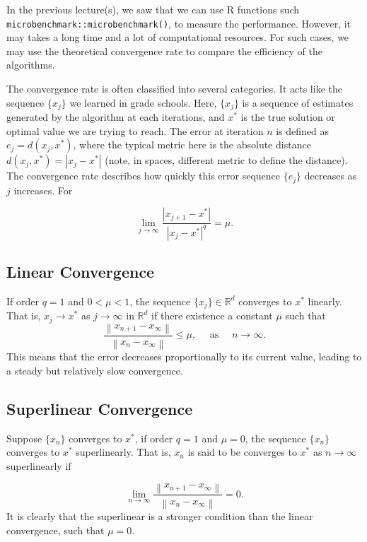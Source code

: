 \documentclass[
  letterpaper,
  DIV=11,
  numbers=noendperiod]{scrreprt}
\begin{document}
In the previous lecture(s), we saw that we can use R functions such
\texttt{microbenchmark::microbenchmark()}, to measure the performance.
However, it may takes a long time and a lot of computational resources.
For such cases, we may use the theoretical convergence rate to compare
the efficiency of the algorithms.

The convergence rate is often classified into several categories. It
acts like the sequence \(\{x_j\}\) we learned in grade schools. Here,
\(\{x_j\}\) is a sequence of estimates generated by the algorithm at
each iterations, and \(x^*\) is the true solution or optimal value we
are trying to reach. The error at iteration \(n\) is defined as
\(e_j = d(x_j,x^*)\), where the typical metric here is the absolute
distance \(d(x_j,x^*)=|x_j-x^*|\) (note, in spaces, different metric to
define the distance). The convergence rate describes how quickly this
error sequence \(\{e_j\}\) decreases as \(j\) increases. For

\[
\lim_{j \to \infty} \frac{\left|x_{j+1}-x^* \right|}{\left|x_j-x^* \right|^q }=\mu.
\]

\subsection{Linear Convergence}\label{linear-convergence}

If order \(q = 1\) and \(0 < \mu < 1\), the sequence
\(\{x_j\}\in\mathbb R^d\) converges to \(x^*\) linearly. That is,
\(x_j\to x^*\) as \(j\to\infty\) in \(\mathbb R^d\) if there existence a
constant \(\mu\) such that \[
  \frac{\left\|x_{n+1}-x_{\infty}\right\|}{\left\|x_n-x_{\infty}\right\|} \le \mu,\quad \text{ as } \quad n\to\infty.
\] This means that the error decreases proportionally to its current
value, leading to a steady but relatively slow convergence.

\subsection{Superlinear Convergence}\label{superlinear-convergence}

Suppose \(\{x_n\}\) converges to \(x^*\), if order \(q = 1\) and
\(\mu = 0\), the sequence \(\{x_n\}\) converges to \(x^*\)
superlinearly. That is, \(x_n\) is said to be converges to \(x^*\) as
\(n\to\infty\) superlinearly if

\[
\lim _{n \to \infty} \frac{\left\|x_{n+1}-x_{\infty}\right\|}{\left\|x_n-x_{\infty}\right\|}=0.
\] It is clearly that the superlinear is a stronger condition than the
linear convergence, such that \(\mu=0\).
\end{document}
